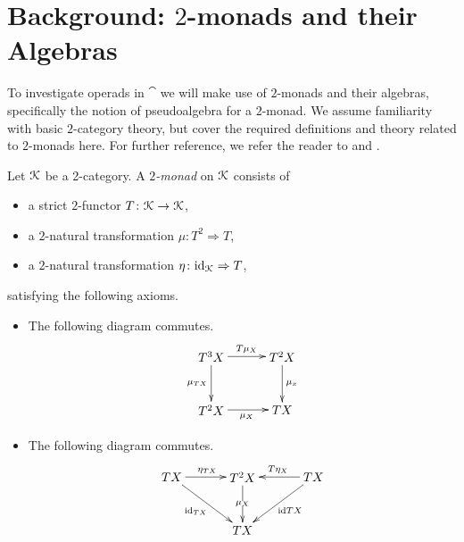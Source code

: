 
\section{Background: $2$-monads and their Algebras}

To investigate operads in $\cat$ we will make use of $2$-monads and their algebras, specifically the notion of pseudoalgebra for a $2$-monad. We assume familiarity with basic $2$-category theory, but cover the required definitions and theory related to $2$-monads here. For further reference, we refer the reader to \cite{BKP} and \cite{power-gen}.

\begin{Defi}[($2$-monad)]\label{Defi:2monad}
Let $\mathcal{K}$ be a 2-category. A \emph{$2$-monad} on $\mathcal{K}$ consists of
    \begin{itemize}
        \item a strict $2$-functor $T \colon \mathcal{K} \rightarrow \mathcal{K}$,
        \item a $2$-natural transformation $\mu \colon T^2 \Rightarrow T$,
        \item a $2$-natural transformation $\eta \colon \textrm{id}_{\mathcal{K}} \Rightarrow T$,
    \end{itemize}
satisfying the following axioms.
    \begin{itemize}
        \item The following diagram commutes.
        \[
            \xy
                (0,0)*+{T^3X}="00";
                (20,0)*+{T^2X}="10";
                (0,-15)*+{T^2X}="01";
                (20,-15)*+{TX}="11";
                {\ar^{T\mu_X} "00" ; "10"};
                {\ar^{\mu_x} "10" ; "11"};
                {\ar_{\mu_{TX}} "00" ;  "01"};
                {\ar_{\mu_X} "01" ; "11"};
            \endxy
        \]
        \item The following diagram commutes.
        \[
            \xy
                (0,0)*+{TX}="00";
                (20,0)*+{T^2X}="10";
                (40,0)*+{TX}="20";
                (20,-15)*+{TX}="11";
                {\ar^{\eta_{TX}} "00" ; "10"};
                {\ar_{T\eta_X} "20" ; "10"};
                {\ar|{\mu_X} "10" ; "11"};
                {\ar_{\id_{TX}} "00" ; "11"};
                {\ar^{\id{TX}} "20" ; "11"};
            \endxy
        \]
\end{itemize}
\end{Defi}

